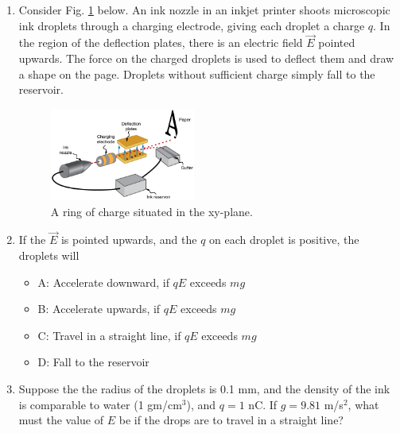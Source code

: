 \documentclass{article}
\begin{document}
\begin{enumerate}
\item Consider Fig. \ref{fig:ring} below.  An ink nozzle in an inkjet printer shoots microscopic ink droplets through a charging electrode, giving each droplet a charge $q$.  In the region of the deflection plates, there is an electric field $\vec{E}$ pointed upwards.  The force on the charged droplets is used to deflect them and draw a shape on the page.  Droplets without sufficient charge simply fall to the reservoir.
\begin{figure}[ht]
\centering
\includegraphics[width=0.45\textwidth]{figures/inkjet.jpeg}
\caption{\label{fig:ring} A ring of charge situated in the xy-plane.}
\end{figure}
\item If the $\vec{E}$ is pointed upwards, and the $q$ on each droplet is positive, the droplets will
\begin{itemize}
\item A: Accelerate downward, if $q E$ exceeds $m g$
\item B: Accelerate upwards, if $q E$ exceeds $m g$
\item C: Travel in a straight line, if $q E$ exceeds $m g$
\item D: Fall to the reservoir
\end{itemize}
\item Suppose the the radius of the droplets is 0.1 mm, and the density of the ink is comparable to water (1 gm/cm$^3$), and $q = 1$ nC.  If $g = 9.81$ m/s$^2$, what must the value of $E$ be if the drops are to travel in a straight line?
\end{enumerate}
\end{document}

